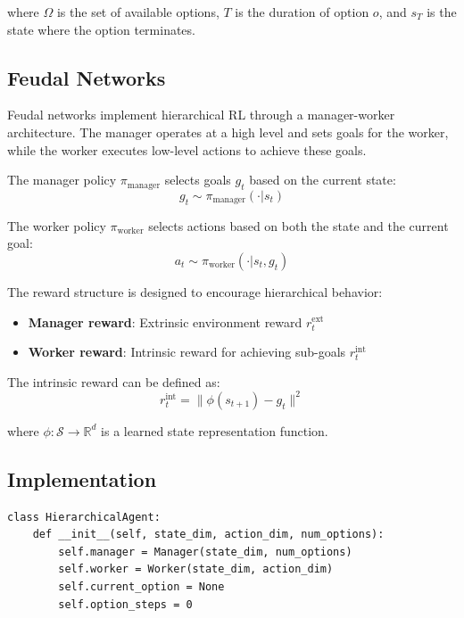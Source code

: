 \documentclass[12pt]{article}
\begin{document}
{{{where $\Omega$ is the set of available options, $T$ is the duration of option $o$, and $s_T$ is the state where the option terminates.

\subsection{Feudal Networks}

Feudal networks implement hierarchical RL through a manager-worker architecture. The manager operates at a high level and sets goals for the worker, while the worker executes low-level actions to achieve these goals.

The manager policy $\pi_{\text{manager}}$ selects goals $g_t$ based on the current state:
\begin{equation}
g_t \sim \pi_{\text{manager}}(\cdot | s_t)
\end{equation}

The worker policy $\pi_{\text{worker}}$ selects actions based on both the state and the current goal:
\begin{equation}
a_t \sim \pi_{\text{worker}}(\cdot | s_t, g_t)
\end{equation}

The reward structure is designed to encourage hierarchical behavior:
\begin{itemize}
\item \textbf{Manager reward}: Extrinsic environment reward $r_t^{\text{ext}}$
\item \textbf{Worker reward}: Intrinsic reward for achieving sub-goals $r_t^{\text{int}}$
\end{itemize}

The intrinsic reward can be defined as:
\begin{equation}
r_t^{\text{int}} = \| \phi(s_{t+1}) - g_t \|^2
\end{equation}

where $\phi: \mathcal{S} \rightarrow \mathbb{R}^d$ is a learned state representation function.

\subsection{Implementation}

\begin{verbatim}
class HierarchicalAgent:
    def __init__(self, state_dim, action_dim, num_options):
        self.manager = Manager(state_dim, num_options)
        self.worker = Worker(state_dim, action_dim)
        self.current_option = None
        self.option_steps = 0
        

\end{verbatim}}}}
\end{document}
